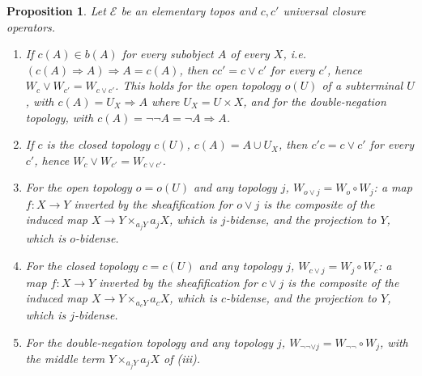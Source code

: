 \documentclass[11pt]{amsart}
\newtheorem{prop}[thm]{Proposition}
\theoremstyle{definition}
\newcommand{\cE}{\mathcal E}
\begin{document}
\begin{prop}\label{prop:openclosed}
Let $\cE$ be an elementary topos and $c,c'$ universal closure operators.
\begin{enumerate}
\item[(i)] If $c(A)\in b(A)$ for every subobject $A$ of every $X$, i.e.\
$(c(A)\Rightarrow A)\Rightarrow A=c(A)$, then $cc'=c\vee c'$ for every $c'$,
hence $W_c\vee W_{c'}=W_{c\vee c'}$. This holds for the open topology
$o(U)$ of a subterminal $U$, with $c(A)=U_X\Rightarrow A$ where $U_X=U\times
X$, and for the double-negation topology, with $c(A)=\neg\neg A=\neg A
\Rightarrow A$.
\item[(ii)] If $c$ is the closed topology $c(U)$, $c(A)=A\cup U_X$, then
$c'c=c\vee c'$ for every $c'$, hence $W_c\vee W_{c'}=W_{c\vee c'}$.
\item[(iii)] For the open topology $o=o(U)$ and any topology $j$,
$W_{o\vee j}=W_o\circ W_j$: a map $f\colon X\to Y$ inverted by the
sheafification for $o\vee j$ is the composite of the induced map
$X\to Y\times_{a_jY}a_jX$, which is $j$-bidense, and the projection to $Y$,
which is $o$-bidense.
\item[(iv)] For the closed topology $c=c(U)$ and any topology $j$,
$W_{c\vee j}=W_j\circ W_c$: a map $f\colon X\to Y$ inverted by the
sheafification for $c\vee j$ is the composite of the induced map
$X\to Y\times_{a_cY}a_cX$, which is $c$-bidense, and the projection to $Y$,
which is $j$-bidense.
\item[(v)] For the double-negation topology and any topology $j$,
$W_{\neg\neg\vee j}=W_{\neg\neg}\circ W_j$, with the middle term
$Y\times_{a_jY}a_jX$ of (iii).
\end{enumerate}
\end{prop}
\end{document}
